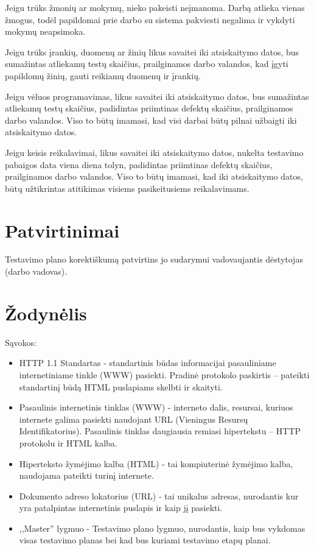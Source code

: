 Jeigu trūks žmonių ar mokymų, nieko pakeisti neįmanoma. Darbą atlieka vienas žmogus, todėl papildomai prie darbo su sistema pakviesti negalima ir vykdyti mokymų neapsimoka. 

Jeigu trūks įrankių, duomenų ar žinių likus savaitei iki atsiskaitymo datos, bus sumažintas atliekamų testų skaičius, prailginamos darbo valandos, kad įgyti papildomų žinių, gauti reikiamų duomenų ir įrankių.

Jeigu vėluos programavimas, likus savaitei iki atsiskaitymo datos, bus sumažintas atliekamų testų skaičius, padidintas priimtinas defektų skaičius, prailginamos darbo valandos. Viso to būtų imamasi, kad visi darbai būtų pilnai užbaigti iki atsiskaitymo datos.

Jeigu keisis reikalavimai, likus savaitei iki atsiskaitymo datos, nukelta testavimo pabaigos data viena diena tolyn, padidintas priimtinas defektų skaičius, prailginamos darbo valandos. Viso to būtų imamasi, kad iki atsiskaitymo datos, būtų užtikrintas atitikimas visiems pasikeitusiems reikalavimams.

\section{Patvirtinimai}

Testavimo plano korektiškumą patvirtins jo sudarymui vadovaujantis dėstytojas (darbo vadovas).

\section{Žodynėlis}

Sąvokos:

\begin{itemize}
	\item HTTP 1.1 Standartas - standartinis būdas informacijai pasauliniame internetiniame tinkle (WWW) pasiekti. 
		  Pradinė protokolo paskirtis – pateikti standartinį būdą HTML puslapiams skelbti ir skaityti.
	\item Pasaulinis internetinis tinklas (WWW) - interneto dalis, resursai, kuriuos internete galima pasiekti naudojant URL (Vieningus Resursų Identifikatorius).
		  Pasaulinis tinklas daugiausia remiasi hipertekstu – HTTP protokolu ir HTML kalba.
	\item Hiperteksto žymėjimo kalba (HTML) - tai kompiuterinė žymėjimo kalba, naudojama pateikti turinį internete.
	\item Dokumento adreso lokatorius (URL) - tai unikalus adresas, nurodantis kur yra patalpintas internetinis puslapis ir kaip jį pasiekti.
	\item ,,Master'' lygmuo - Testavimo plano lygmuo, nurodantis, kaip bus vykdomas visas testavimo planas bei kad bus kuriami testavimo etapų planai.
	
\end{itemize}

